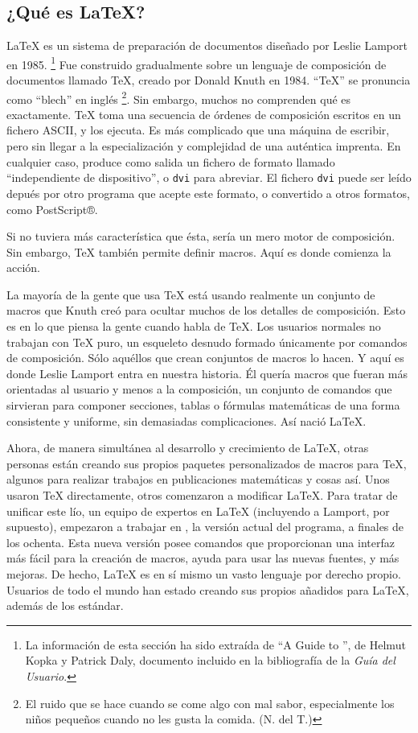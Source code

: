 \subsection{¿Qué es \LaTeX{}?}

\LaTeX{} es un sistema de preparación de documentos diseñado por Leslie
Lamport en 1985.%
\footnote{La información de esta sección ha sido extraída de {}``A Guide to
\LaTeXe{}'', de Helmut Kopka y Patrick Daly, documento incluido en
la bibliografía de la \emph{Guía del Usuario}.%
} Fue construido gradualmente sobre un lenguaje de composición de documentos
llamado \TeX{}, creado por Donald Knuth en 1984. {}``\TeX{}'' se
pronuncia como {}``blech'' en inglés%
\footnote{El ruido que se hace cuando se come algo con mal sabor, especialmente
los niños pequeños cuando no les gusta la comida. (N. del T.)%
}. Sin embargo, muchos no comprenden qué es exactamente. \TeX{} toma
una secuencia de órdenes de composición escritos en un fichero ASCII,
y los ejecuta. Es más complicado que una máquina de escribir, pero
sin llegar a la especialización y complejidad de una auténtica imprenta.
En cualquier caso, produce como salida un fichero de formato llamado
{}``independiente de dispositivo'', o \texttt{dvi} para abreviar.
El fichero \texttt{dvi} puede ser leído depués por otro programa que
acepte este formato, o convertido a otros formatos, como PostScript®.

Si no tuviera más característica que ésta, sería un mero motor de
composición. Sin embargo, \TeX{} también permite definir macros. Aquí
es donde comienza la acción.

La mayoría de la gente que usa \TeX{} está usando realmente un conjunto
de macros que Knuth creó para ocultar muchos de los detalles de composición.
Esto es en lo que piensa la gente cuando habla de \TeX{}. Los usuarios
normales no trabajan con \TeX{} puro, un esqueleto desnudo formado
únicamente por comandos de composición. Sólo aquéllos que crean conjuntos
de macros lo hacen. Y aquí es donde Leslie Lamport entra en nuestra
historia. Él quería macros que fueran más orientadas al usuario y
menos a la composición, un conjunto de comandos que sirvieran para
componer secciones, tablas o fórmulas matemáticas de una forma consistente
y uniforme, sin demasiadas complicaciones. Así nació \LaTeX{}.

Ahora, de manera simultánea al desarrollo y crecimiento de \LaTeX{},
otras personas están creando sus propios paquetes personalizados de
macros para \TeX{}, algunos para realizar trabajos en publicaciones
matemáticas y cosas así. Unos usaron \TeX{} directamente, otros comenzaron
a modificar \LaTeX{}. Para tratar de unificar este lío, un equipo
de expertos en \LaTeX{} (incluyendo a Lamport, por supuesto), empezaron
a trabajar en \LaTeXe{}, la versión actual del programa, a finales
de los ochenta. Esta nueva versión posee comandos que proporcionan
una interfaz más fácil para la creación de macros, ayuda para usar
las nuevas fuentes, y más mejoras. De hecho, \LaTeX{} es en sí mismo
un vasto lenguaje por derecho propio. Usuarios de todo el mundo han
estado creando sus propios añadidos para \LaTeX{}, además de los estándar.

